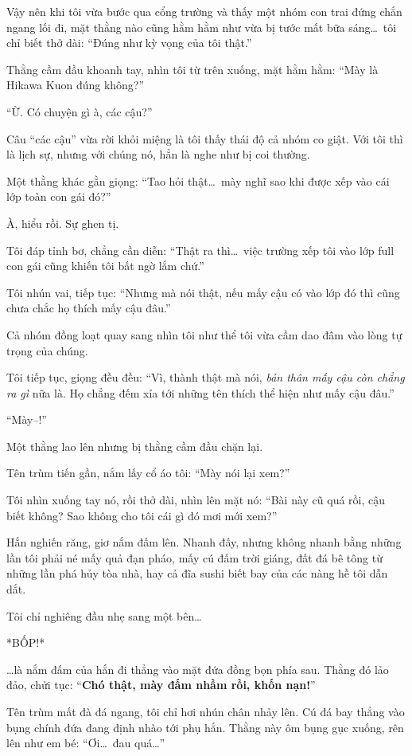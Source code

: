 \documentclass[../main.tex]{subfiles}
\begin{document}
Vậy nên khi tôi vừa bước qua cổng trường và thấy một nhóm con trai đứng chắn ngang lối đi, mặt thằng nào cũng hằm hằm như vừa bị tước mất bữa sáng\dots\ tôi chỉ biết thở dài: ``Đúng như kỳ vọng của tôi thật.''

Thằng cầm đầu khoanh tay, nhìn tôi từ trên xuống, mặt hằm hằm: ``Mày là Hikawa Kuon đúng không?''

``Ừ. Có chuyện gì à, các cậu?''

Câu ``các cậu'' vừa rời khỏi miệng là tôi thấy thái độ cả nhóm co giật. Với tôi thì là lịch sự, nhưng với chúng nó, hẳn là nghe như bị coi thường.

Một thằng khác gằn giọng: ``Tao hỏi thật\dots\ mày nghĩ sao khi được xếp vào cái lớp toàn con gái đó?''

À, hiểu rồi. Sự ghen tị.

Tôi đáp tỉnh bơ, chẳng cần diễn: ``Thật ra thì\dots\ việc trường xếp tôi vào lớp full con gái cũng khiến tôi bất ngờ lắm chứ.''

Tôi nhún vai, tiếp tục: ``Nhưng mà nói thật, nếu mấy cậu có vào lớp đó thì cũng chưa chắc họ thích mấy cậu đâu.''

Cả nhóm đồng loạt quay sang nhìn tôi như thể tôi vừa cầm dao đâm vào lòng tự trọng của chúng.

Tôi tiếp tục, giọng đều đều: ``Vì, thành thật mà nói, \emph{bản thân mấy cậu còn chẳng ra gì} nữa là. Họ chẳng đếm xỉa tới những tên thích thể hiện như mấy cậu đâu.''

``Mày--!''

Một thằng lao lên nhưng bị thằng cầm đầu chặn lại.

Tên trùm tiến gần, nắm lấy cổ áo tôi: ``Mày nói lại xem?''

Tôi nhìn xuống tay nó, rồi thở dài, nhìn lên mặt nó: ``Bài này cũ quá rồi, cậu biết không? Sao không cho tôi cái gì đó mơi mới xem?''

Hắn nghiến răng, giơ nắm đấm lên. Nhanh đấy, nhưng không nhanh bằng những lần tôi phải né mấy quả đạn pháo, mấy cú đấm trời giáng, đất đá bê tông từ những lần phá hủy tòa nhà, hay cả đĩa sushi biết bay của các nàng hề tôi dẫn dắt.

Tôi chỉ nghiêng đầu nhẹ sang một bên\dots

*BỐP!*

\dots là nắm đấm của hắn đi thẳng vào mặt đứa đồng bọn phía sau. Thằng đó lảo đảo, chửi tục: ``\textbf{Chó thật, mày đấm nhầm rồi, khốn nạn!}''

Tên trùm mất đà đá ngang, tôi chỉ hơi nhún chân nhảy lên. Cú đá bay thẳng vào bụng chính đứa đang định nhào tới phụ hắn. Thằng này ôm bụng gục xuống, rên lên như em bé: ``Ơi\dots\ đau quá\dots''
\end{document}
